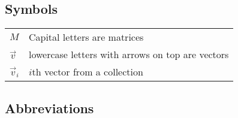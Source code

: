 
\subsection*{Symbols}

\begin{tabular}{ll}
$M$	& Capital letters are matrices\\
$\vec v$	& lowercase letters with arrows on top are vectors\\
$\vec v_i$	& $i$th vector from a collection
\end{tabular}
%
%

\subsection*{Abbreviations}

